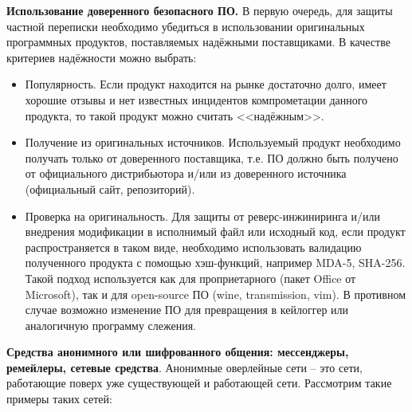 \textbf{Использование доверенного безопасного  ПО. } В первую очередь, для защиты частной переписки необходимо убедиться в использовании оригинальных программных продуктов, поставляемых надёжными поставщиками. В качестве критериев надёжности можно выбрать:
\begin{itemize}
	\item Популярность. Если продукт находится на рынке достаточно долго, имеет хорошие отзывы и нет известных инцидентов компрометации данного продукта, то такой продукт можно считать <<надёжным>>. 
	\item Получение из оригинальных источников. Используемый продукт необходимо получать только от доверенного поставщика, т.е. ПО должно быть получено от официального дистрибьютора и/или из доверенного источника (официальный сайт, репозиторий).	
	\item Проверка на оригинальность. Для защиты от реверс-инжиниринга и/или внедрения модификации в исполнимый файл или исходный код, если продукт распространяется в таком виде, необходимо использовать валидацию полученного     продукта с помощью хэш-функций, например MDA-5, SHA-256. Такой подход используется как для проприетарного    (пакет Office от Microsoft), так и для open-source ПО (wine, transmission, vim). В противном случае возможно изменение ПО для превращения в кейлоггер или аналогичную программу слежения. \\
\end{itemize}


\textbf{Средства анонимного или шифрованного общения: мессенджеры, ремейлеры, сетевые средства}. Анонимные оверлейные сети -- это сети, работающие поверх уже существующей и работающей сети. Рассмотрим такие примеры таких сетей:

